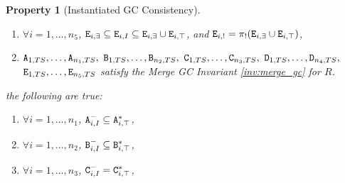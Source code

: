 \documentclass{article}
\numberwithin{equation}{section}
\newtheorem{property}{Property}[section]
\renewcommand{\tt}[1]{\ifmmode\text{\texttt{#1}}\else\texttt{#1}\fi}
\begin{document}
\begin{property}[Instantiated GC Consistency]
\begin{enumerate}
\item $\forall i=1,\dots,n_5$, $\tt{E}_{i,\exists} \subseteq \tt{E}_{i,I} \subseteq \tt{E}_{i,\exists} \cup \tt{E}_{i,\top}$, and $\tt{E}_{i,!} = \pi_!(\tt{E}_{i,\exists} \cup \tt{E}_{i,\top})$,
\item $\tt{A}_{1,TS}, \dots, \tt{A}_{n_1,TS},$ $\tt{B}_{1,TS}, \dots, \tt{B}_{n_2,TS},$ $\tt{C}_{1,TS}, \dots, \tt{C}_{n_3,TS},$ $\tt{D}_{1,TS}, \dots, \tt{D}_{n_4,TS},$ $\tt{E}_{1,TS}, \dots, \tt{E}_{n_5,TS}$ satisfy the Merge GC Invariant \ref{inv:merge_gc} for $R$.
\end{enumerate}
the following are true:
\begin{enumerate}
\item $\forall i=1,\dots,n_1$, $\tt{A}_{i,I}^- \subseteq \tt{A}_{i,\top}^*$,
\item $\forall i=1,\dots,n_2$, $\tt{B}_{i,I}^- \subseteq \tt{B}_{i,\top}^*$,
\item $\forall i=1,\dots,n_3$, $\tt{C}_{i,I}^- =         \tt{C}_{i,\top}^*$,
\end{enumerate}
\end{property}



\end{document}
